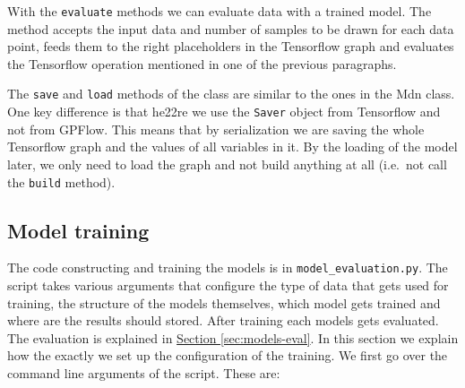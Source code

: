 \documentclass[12pt,a4paper,twoside]{scrartcl}
\numberwithin{equation}{section}
\newcommand{\refsec}[1]{\hyperref[#1]{Section \ref*{#1}}}
\begin{document}
With the \texttt{evaluate} methods we can evaluate data with a trained model. The method accepts the input data and number of samples to be drawn for each data point, feeds them to the right placeholders in the Tensorflow graph and evaluates the Tensorflow operation mentioned in one of the previous paragraphs.

The \texttt{save} and \texttt{load} methods of the class are similar to the ones in the Mdn class. One key difference is that he22re we use the \texttt{Saver} object from Tensorflow and not from GPFlow. This means that by serialization we are saving the whole Tensorflow graph and the values of all variables in it. By the loading of the model later, we only need to load the graph and not build anything at all (i.e.\ not call the \texttt{build} method). 
\subsection{Model training}\label{sec:models-train}
The code constructing and training the models is in \texttt{model\_evaluation.py}. The script takes various arguments that configure the type of data that gets used for training, the structure of the models themselves, which model gets trained and where are the results should stored. After training each models gets evaluated. The evaluation is explained in \refsec{sec:models-eval}. In this section we explain how the exactly we set up the configuration of the training. We first go over the command line arguments of the script. These are:
\end{document}
